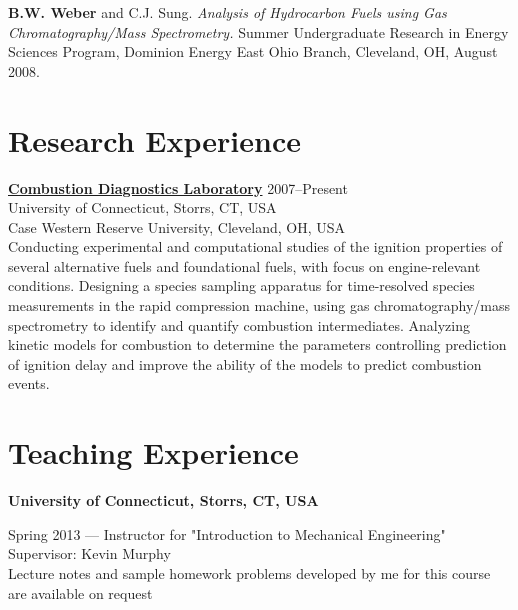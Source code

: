 \begin{bibsection}
\item[] \textbf{ B.W. Weber} and C.J. Sung. \textit{Analysis of
        Hydrocarbon Fuels using Gas Chromatography/Mass Spectrometry.}
        Summer Undergraduate Research in Energy Sciences Program,
        Dominion Energy East Ohio Branch, Cleveland, OH, August 2008.
\end{bibsection}

\vspace{0.1in}

\section{{\sectionfont Research Experience}}

\href{http://combdiaglab.engr.uconn.edu}
{\textbf{Combustion Diagnostics Laboratory}} \hfill 2007--Present\\
University of Connecticut, Storrs, CT, USA\\
Case Western Reserve University, Cleveland, OH, USA\\

Conducting experimental and computational studies of the ignition
properties of several alternative fuels and foundational fuels, with
focus on engine-relevant conditions.
Designing a species sampling apparatus for time-resolved
species measurements in the rapid compression machine, using gas
chromatography/mass spectrometry to identify and quantify
combustion intermediates.
Analyzing kinetic models for combustion to determine the parameters
controlling prediction of ignition delay and improve the ability of
the models to predict combustion events.

\section{{\sectionfont Teaching Experience}}

\textbf{University of Connecticut, Storrs, CT, USA}

\vspace{\baselineskip}

Spring 2013 --- Instructor for "Introduction to Mechanical Engineering"\\
Supervisor: Kevin Murphy\\
Lecture notes and sample homework problems developed by me for this course
are available on request

\vspace{\baselineskip}

